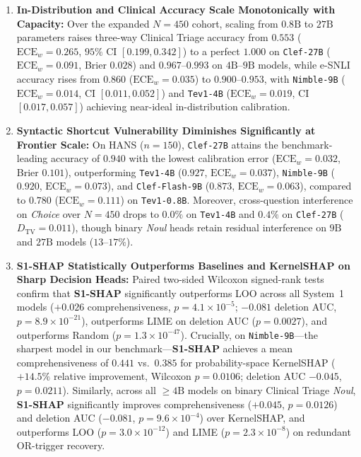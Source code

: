 \documentclass[10pt]{article}
\begin{document}
\begin{enumerate}
\item \textbf{In-Distribution and Clinical Accuracy Scale Monotonically with Capacity:} Over the expanded $N=450$ cohort, scaling from $0.8\text{B}$ to $27\text{B}$ parameters raises three-way Clinical Triage accuracy from $0.553$ ($\text{ECE}_w = 0.265$, $95\%$ CI $[0.199, 0.342]$) to a perfect $\mathbf{1.000}$ on \texttt{Clef-27B} ($\text{ECE}_w = \mathbf{0.091}$, Brier $0.028$) and $0.967$--$0.993$ on $4\text{B}$--$9\text{B}$ models, while e-SNLI accuracy rises from $0.860$ ($\text{ECE}_w = 0.035$) to $0.900$--$0.953$, with \texttt{Nimble-9B} ($\text{ECE}_w = 0.014$, CI $[0.011, 0.052]$) and \texttt{Tev1-4B} ($\text{ECE}_w = 0.019$, CI $[0.017, 0.057]$) achieving near-ideal in-distribution calibration.
\item \textbf{Syntactic Shortcut Vulnerability Diminishes Significantly at Frontier Scale:} On HANS ($n=150$), \texttt{Clef-27B} attains the benchmark-leading accuracy of $\mathbf{0.940}$ with the lowest calibration error ($\text{ECE}_w = \mathbf{0.032}$, Brier $0.101$), outperforming \texttt{Tev1-4B} ($0.927$, $\text{ECE}_w = 0.037$), \texttt{Nimble-9B} ($0.920$, $\text{ECE}_w = 0.073$), and \texttt{Clef-Flash-9B} ($0.873$, $\text{ECE}_w = 0.063$), compared to $0.780$ ($\text{ECE}_w = 0.111$) on \texttt{Tev1-0.8B}. Moreover, cross-question interference on \emph{Choice} over $N=450$ drops to $0.0\%$ on \texttt{Tev1-4B} and $0.4\%$ on \texttt{Clef-27B} ($D_{\text{TV}} = 0.011$), though binary \emph{Noul} heads retain residual interference on $9\text{B}$ and $27\text{B}$ models ($13$--$17\%$).
\item \textbf{S1-SHAP Statistically Outperforms Baselines and KernelSHAP on Sharp Decision Heads:} Paired two-sided Wilcoxon signed-rank tests confirm that \textbf{S1-SHAP} significantly outperforms LOO across all System~1 models ($+0.026$ comprehensiveness, $p = 4.1 \times 10^{-5}$; $-0.081$ deletion AUC, $p = 8.9 \times 10^{-21}$), outperforms LIME on deletion AUC ($p = 0.0027$), and outperforms Random ($p = 1.3 \times 10^{-47}$). Crucially, on \texttt{Nimble-9B}---the sharpest model in our benchmark---\textbf{S1-SHAP} achieves a mean comprehensiveness of $\mathbf{0.441}$ vs.\ $0.385$ for probability-space KernelSHAP ($\mathbf{+14.5\%}$ relative improvement, Wilcoxon $p = 0.0106$; deletion AUC $-0.045$, $p = 0.0211$). Similarly, across all $\ge 4\text{B}$ models on binary Clinical Triage \emph{Noul}, \textbf{S1-SHAP} significantly improves comprehensiveness ($+0.045$, $p = 0.0126$) and deletion AUC ($-0.081$, $p = 9.6 \times 10^{-4}$) over KernelSHAP, and outperforms LOO ($p = 3.0 \times 10^{-12}$) and LIME ($p = 2.3 \times 10^{-8}$) on redundant OR-trigger recovery.

\end{enumerate}
\end{document}
